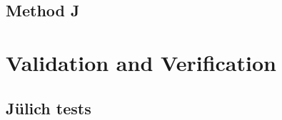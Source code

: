 \documentclass[%
paper=A4,					%
twoside=true,				%
openright,					%
parskip=full,				%
chapterprefix=true,			%
11pt,						%
headings=normal,			%
bibliography=totoc,			%
listof=totoc,				%
titlepage=on,				%
captions=tableabove,		%
draft=false,				%
]{scrreprt}%
\begin{document}
\subsection{Method J}


\newpage
\section{Validation and Verification}
\subsection{J\"ulich tests}



% 
% 

\end{document}
